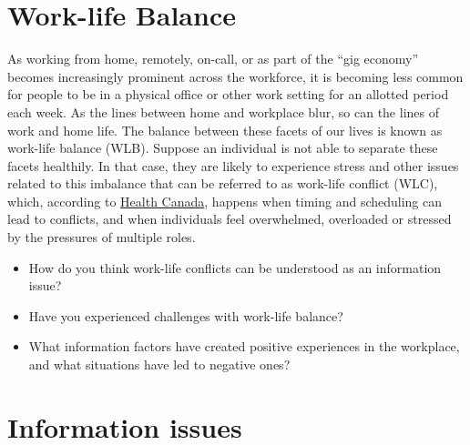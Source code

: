 \documentclass[
  letterpaper,
  DIV=11,
  numbers=noendperiod]{scrreprt}
\providecommand{\tightlist}{%
  \setlength{\itemsep}{0pt}\setlength{\parskip}{0pt}}
\begin{document}
\section{Work-life Balance}\label{work-life-balance}

As working from home, remotely, on-call, or as part of the ``gig
economy'' becomes increasingly prominent across the workforce, it is
becoming less common for people to be in a physical office or other work
setting for an allotted period each week. As the lines between home and
workplace blur, so can the lines of work and home life. The balance
between these facets of our lives is known as work-life balance (WLB).
Suppose an individual is not able to separate these facets healthily. In
that case, they are likely to experience stress and other issues related
to this imbalance that can be referred to as work-life conflict (WLC),
which, according to
\href{https://www.canada.ca/en/health-canada/services/environmental-workplace-health/reports-publications/occupational-health-safety/reducing-work-life-conflict-what-works-what-doesn.html}{Health
Canada}, happens when timing and scheduling can lead to conflicts, and
when individuals feel overwhelmed, overloaded or stressed by the
pressures of multiple roles.

\begin{tcolorbox}[enhanced jigsaw, arc=.35mm, bottomrule=.15mm, bottomtitle=1mm, breakable, colback=white, colbacktitle=quarto-callout-tip-color!10!white, colframe=quarto-callout-tip-color-frame, coltitle=black, left=2mm, leftrule=.75mm, opacityback=0, opacitybacktitle=0.6, rightrule=.15mm, title=\textcolor{quarto-callout-tip-color}{\faLightbulb}\hspace{0.5em}{Pause and reflect}, titlerule=0mm, toprule=.15mm, toptitle=1mm]

\begin{itemize}
\tightlist
\item
  How do you think work-life conflicts can be understood as an
  information issue?
\item
  Have you experienced challenges with work-life balance?
\item
  What information factors have created positive experiences in the
  workplace, and what situations have led to negative ones?
\end{itemize}

\end{tcolorbox}

\section{Information issues}\label{information-issues-1}
\end{document}
